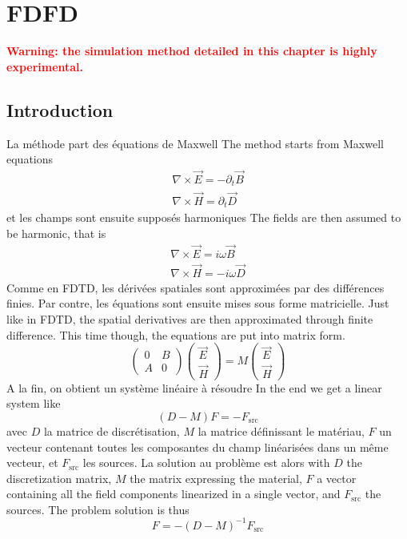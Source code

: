 \chapter{FDFD}

\langswitch
{
	\fwarn
}{
	\textbf{\textcolor{red}{Warning: the simulation method detailed in this chapter is highly experimental.}}
}

\section{Introduction}

\langswitch
{
	La méthode part des équations de Maxwell
}{
	The method starts from Maxwell equations
}
\begin{equation}\begin{array}{l}
	\nabla \times \vec E=- \partial_t \vec B \\
	\nabla \times \vec H= \partial_t \vec D 
\end{array}\end{equation}
\langswitch
{
	et les champs sont ensuite supposés harmoniques
}{
	The fields are then assumed to be harmonic, that is
}
\begin{equation}\begin{array}{l}
	\nabla \times \vec E = i \omega \vec B \\
	\nabla \times \vec H = -i\omega \vec D 
\end{array}\end{equation}
\langswitch
{
	Comme en FDTD, les dérivées spatiales sont approximées par des différences finies. Par contre, les équations sont ensuite mises sous forme matricielle.
}{
	Just like in FDTD, the spatial derivatives are then approximated through finite difference. This time though, the equations are put into matrix form. 
}
\begin{equation}
	\begin{pmatrix}
		0 & B \\
		A & 0
	\end{pmatrix}
	\begin{pmatrix}
		\vec E \\ \vec H
	\end{pmatrix}=
	M
	\begin{pmatrix}
		\vec E \\ \vec H
	\end{pmatrix}
\end{equation}
\langswitch
{
	A la fin, on obtient un système linéaire à résoudre
}{
	In the end we get a linear system like
}
\begin{equation}
	(D-M)F=-F_\textrm{src}
\end{equation}
\langswitch
{
	avec $D$ la matrice de discrétisation, $M$ la matrice définissant le matériau, $F$ un vecteur contenant toutes les composantes du champ linéarisées dans un même vecteur, et $F_\textrm{src}$ les sources. La solution au problème est alors
}{
	with $D$ the discretization matrix, $M$ the matrix expressing the material, $F$ a vector containing all the field components linearized in a single vector, and $F_\textrm{src}$ the sources. The problem solution is thus
}
\begin{equation}
	F=-(D-M)^{-1}F_\textrm{src}
\end{equation}


